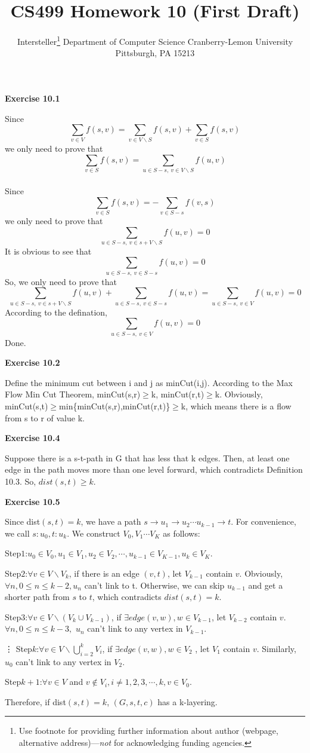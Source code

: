\documentclass{article} %
\title{CS499 Homework 10 (First Draft)}
\author{
	Intersteller\thanks{ Use footnote for providing further information
		about author (webpage, alternative address)---\emph{not} for acknowledging
		funding agencies.}
	Department of Computer Science
	Cranberry-Lemon University
	Pittsburgh, PA 15213
}
\begin{document}
	
	
	\maketitle
	
	
	\textbf{Exercise 10.1}\par
	Since $$\sum_{v\in V}f(s,v)=\sum_{v\in V\backslash S}f(s,v)+\sum_{v\in S}f(s,v)$$ we only need to prove that $$\sum_{v\in S}f(s,v)=\sum_{u\in S-s,\ v\in V\backslash S}f(u,v)$$\\
	Since $$\sum_{v\in S}f(s,v)=-\sum_{v\in S-s}f(v,s)$$ we only need to prove that $$\sum_{u\in S-s,\ v\in s+V\backslash S}f(u,v)=0$$
	It is obvious to see that $$\sum_{u\in S-s,\ v\in S-s}f(u,v)=0$$
	So, we only need to prove that $$\sum_{u\in S-s,\ v\in s+V\backslash S}f(u,v)+\sum_{u\in S-s,\ v\in S-s}f(u,v)=\sum_{u\in S-s,\ v\in V}f(u,v)=0$$
	According to the defination, $$\sum_{u\in S-s,\ v\in V}f(u,v)=0$$
	Done.


	\textbf{Exercise 10.2}\par
	Define the minimum cut between i and j as minCut(i,j). According to the Max Flow Min Cut Theorem, minCut(s,r)$\geq$k, minCut(r,t)$\geq$k. Obviously, minCut(s,t)$\geq$min\{minCut(s,r),minCut(r,t)\}$\geq$k, which means there is a flow from s to r of value k.

	\textbf{Exercise 10.4}\par
	Suppose there is a s-t-path in G that has less that k edges. Then, at least one edge in the path moves more than one level forward, which contradicts Definition 10.3. So, $dist(s,t)\geq k$.

    \textbf{Exercise 10.5}\par
    Since dist$(s,t)=k$, we have a path $s\rightarrow u_1\rightarrow u_2 \cdots u_{k-1}\rightarrow t$. For convenience, we call $s:u_0,t:u_k$. We construct $V_0, V_1\cdots V_K$ as follows:\par
    Step$1$:$u_0\in V_0, u_1\in V_1, u_2\in V_2,\cdots, u_{k-1}\in V_{K-1}, u_k\in V_K.$\par
    Step$2$:$\forall v\in V \backslash V_k$, if there is an edge $(v,t)$, let $V_{k-1}$ contain $v$. Obviously, $\forall n, 0\leq n \leq k-2, u_n$ can't link to t. Otherwise, we can skip $u_{k-1}$ and get a shorter path from $s$ to $t$, which contradicts $dist(s,t)=k$.\par
    Step$3$:$\forall v\in V \backslash (V_k\cup V_{k-1})$, if $\exists edge (v,w), w\in V_{k-1}$, let $V_{k-2}$ contain $v$.
    $\forall n, 0\leq n\leq k-3,$ $u_n$ can't link to any vertex in $V_{k-1}.$\par
    \vdots
    Step$k$:$\forall v\in V \backslash \bigcup_{i=2}^kV_i$, if $\exists edge (v,w), w\in V_2$ , let $V_1$ contain $v$. Similarly, $u_0$ can't link to any vertex in $V_2$.\par
    Step$k+1$:$\forall v \in V $ and $ v \notin V_i, i \neq 1,2,3,\cdots, k, v \in V_0$.\par
    Therefore, if dist$(s,t)=k$, $(G,s,t,c)$ has a k-layering.
\end{document}
